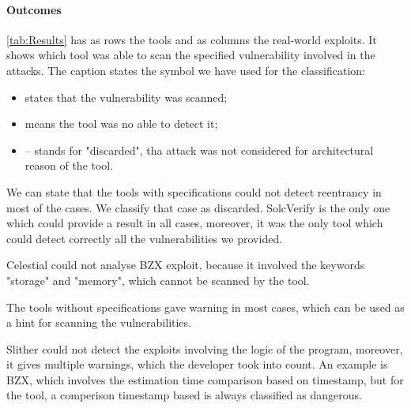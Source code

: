 \paragraph{Outcomes} \autoref{tab:Results} has as rows the tools and as columns the real-world exploits. 
It shows which tool was able to scan the specified vulnerability involved in the attacks.  The caption states the symbol we have used for the classification:
\begin{itemize}
    \item \checkmark states that the vulnerability was scanned;
    \item \xmark means the tool was no able to detect it;
    \item -- stands for "discarded", tha attack was not considered for architectural reason of the tool.
\end{itemize}


We can state that the tools with specifications could not detect reentrancy in most of the cases. We classify that case as discarded. 
SolcVerify is the only one which could provide a result in all cases, moreover, it was the only tool which could detect correctly all the vulnerabilities we provided.

Celestial could not analyse BZX exploit, 
because it involved the keywords "storage" and "memory", which cannot be scanned by the tool. 

The tools without specifications gave warning in most cases, which can be used as a hint for scanning the vulnerabilities. 

Slither could not detect the exploits involving the logic of the program, moreover, it gives multiple warnings, which the developer took into count. 
An example is BZX, which involves the estimation time comparison based on timestamp, but for the tool, a comperison timestamp based is always classified as dangerous.

